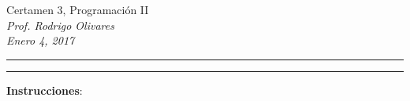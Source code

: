 \documentclass[10pt]{article}
\begin{document}
\begin{center}
    {\Large Certamen 3, Programaci\'on II} \\
    \emph{\small Prof. Rodrigo Olivares} \\
    \emph{\scriptsize Enero 4, 2017}
\end{center}
\vspace*{-35pt}
\begin{center}
    \rule{1\textwidth}{.3pt}
\end{center}
\vspace*{-42pt}
\begin{center}
    \rule{1\textwidth}{2pt}
\end{center}

\vspace*{-15pt}
{\small \textbf{Instrucciones}:}
\vspace*{-15pt}
\end{document}
